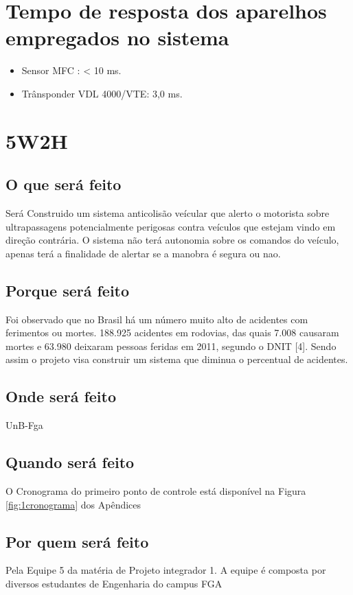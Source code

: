 \section{Tempo de resposta dos aparelhos empregados no sistema}
\begin{itemize}
  \item Sensor MFC \cite{mfc} : < 10 ms.
  \item Trânsponder VDL 4000/VTE: 3,0 ms.
\end{itemize}

\section {5W2H}

\subsection{O que será feito}
Será Construido um sistema anticolisão veícular que alerto o motorista sobre ultrapassagens potencialmente perigosas contra veículos que estejam vindo em direção contrária. O sistema não terá autonomia sobre os comandos do veículo, apenas terá a finalidade de alertar se a manobra é segura ou nao.

\subsection{Porque será feito}
Foi observado que no Brasil há um número muito alto de acidentes com ferimentos ou mortes. 188.925 acidentes em rodovias, das quais 7.008 causaram mortes e 63.980 deixaram pessoas feridas em 2011, segundo o DNIT [4]. Sendo assim o projeto visa construir um sistema que diminua o percentual de acidentes.

\subsection{Onde será feito}
UnB-Fga

\subsection{Quando será feito}
O Cronograma do primeiro ponto de controle está disponível na Figura \ref{fig:1cronograma} dos Apêndices

\subsection{Por quem será feito}
Pela Equipe 5 da matéria de Projeto integrador 1. A equipe é composta por diversos estudantes de Engenharia do campus FGA

